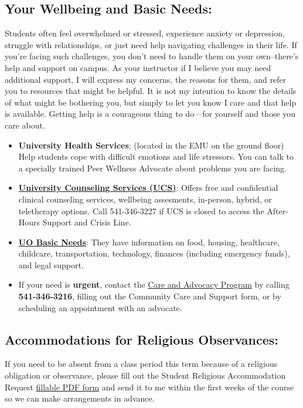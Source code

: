 \subsection*{Your Wellbeing and Basic Needs:}

Students often feel overwhelmed or stressed, experience anxiety or depression, struggle with relationships, or just need help navigating challenges in their life.
If you're facing such challenges, you don't need to handle them on your own--there's help and support on campus. 
As your instructor if I believe you may need additional support, I will express my concerns, the reasons for them, and refer you to resources that might be helpful.
It is not my intention to know the details of what might be bothering you, but simply to let you know I care and that help is available. Getting help is a courageous thing to do—for yourself and those you care about. 

\begin{itemize}

\item \textbf{University Health Services}: (located in the EMU on the ground floor) Help students cope with difficult emotions and life stressors. You can talk to a specially trained Peer Wellness Advocate about problems you are facing.

\item \href{https://counseling.uoregon.edu}{\textbf{University Counseling Services (UCS)}}: Offers free and confidential clinical counseling services, wellbeing assesments, in-person, hybrid, or teletherapy options.
Call 541-346-3227 if UCS is closed to access the After-Hours Support and Crisis Line.

\item \href{https://basicneeds.uoregon.edu/}{\textbf{UO Basic Needs}}:
They have information on food, housing, healthcare, childcare, transportation, technology, finances (including emergency funds), and legal support.

\item If your need is \textbf{\color{darkred} urgent}, contact the \href{https://dos.uoregon.edu/help}{Care and Advocacy Program} by calling \textbf{\color{darkred}541-346-3216}, filling out the Community Care and Support form, or by scheduling an appointment with an advocate.

\end{itemize}

\subsection*{Accommodations for Religious Observances:}
If you need to be absent from a class period this term because of a religious obligation or observance, please fill out the Student Religious Accommodation Request \href{https://provost.uoregon.edu/religious-observance-accommodations-policy}{fillable PDF form} and send it to me within the first weeks of the course so we can make arrangements in advance. 
